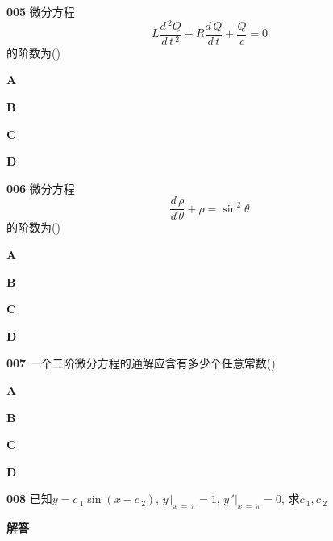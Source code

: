 \documentclass[a4paper,10pt]{article} %
\begin{document}


\textheight


\par\noindent \textbf{005} \quad 微分方程
$$L\frac{d\,^2Q}{d\,t\,^2}+R\frac{d\,Q}{d\,t}+\frac{Q}{c}=0$$
的阶数为\hfill (\quad\quad\quad)
\par\noindent \textbf{A} 
\par\noindent \textbf{B} 
\par\noindent \textbf{C} 
\par\noindent \textbf{D} 





\textheight


\par\noindent \textbf{006} \quad 微分方程
$$\frac{d\,\rho}{d\,\theta}+\rho=\sin^2\theta$$
的阶数为\hfill (\quad\quad\quad)
\par\noindent \textbf{A} 
\par\noindent \textbf{B} 
\par\noindent \textbf{C} 
\par\noindent \textbf{D} 





\textheight


\par\noindent \textbf{007} \quad 一个二阶微分方程的通解应含有多少个任意常数\hfill (\quad\quad\quad)
\par\noindent \textbf{A} 
\par\noindent \textbf{B} 
\par\noindent \textbf{C} 
\par\noindent \textbf{D} 





\textheight


\par\noindent \textbf{008} \quad 已知$y=c\,_1\sin (x-c\,_2)$, $y\,|_{x\,=\,\pi}=1$, $y\,'|_{x\,=\,\pi}=0$, 求$c\,_1, c\,_2$
\par\noindent \textbf{ 解答}
\end{document}
